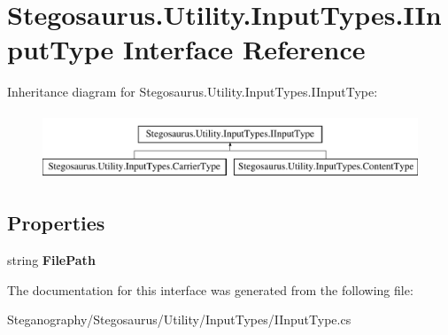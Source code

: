 \hypertarget{interface_stegosaurus_1_1_utility_1_1_input_types_1_1_i_input_type}{}\section{Stegosaurus.\+Utility.\+Input\+Types.\+I\+Input\+Type Interface Reference}
\label{interface_stegosaurus_1_1_utility_1_1_input_types_1_1_i_input_type}
Inheritance diagram for Stegosaurus.\+Utility.\+Input\+Types.\+I\+Input\+Type\+:\begin{figure}[H]
\begin{center}
\leavevmode
\includegraphics[height=2.000000cm]{interface_stegosaurus_1_1_utility_1_1_input_types_1_1_i_input_type}
\end{center}
\end{figure}
\subsection*{Properties}
\begin{DoxyCompactItemize}
\item 
string {\bfseries File\+Path}\hypertarget{interface_stegosaurus_1_1_utility_1_1_input_types_1_1_i_input_type_a629965c94aabed5498436317cf4a67ff}{}\label{interface_stegosaurus_1_1_utility_1_1_input_types_1_1_i_input_type_a629965c94aabed5498436317cf4a67ff}

\end{DoxyCompactItemize}


The documentation for this interface was generated from the following file\+:\begin{DoxyCompactItemize}
\item 
Steganography/\+Stegosaurus/\+Utility/\+Input\+Types/I\+Input\+Type.\+cs\end{DoxyCompactItemize}
